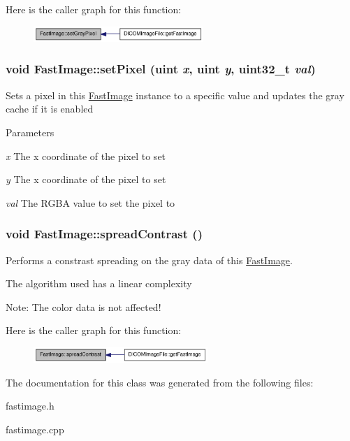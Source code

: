 Here is the caller graph for this function:\nopagebreak
\begin{figure}[H]
\begin{center}
\leavevmode
\includegraphics[width=182pt]{class_fast_image_a1e0ef4ac5b61cc6d96c9cd9c4bada344_icgraph}
\end{center}
\end{figure}


\hypertarget{class_fast_image_a647ac3b76f0198da77cd2e7afa46e1c4}{
\subsubsection[{setPixel}]{\setlength{\rightskip}{0pt plus 5cm}void FastImage::setPixel (uint {\em x}, \/  uint {\em y}, \/  uint32\_\-t {\em val})}}
\label{class_fast_image_a647ac3b76f0198da77cd2e7afa46e1c4}
Sets a pixel in this \hyperlink{class_fast_image}{FastImage} instance to a specific value and updates the gray cache if it is enabled 
\begin{DoxyParams}{Parameters}
\item[{\em x}]The x coordinate of the pixel to set \item[{\em y}]The x coordinate of the pixel to set \item[{\em val}]The RGBA value to set the pixel to \end{DoxyParams}
\hypertarget{class_fast_image_adcf6d77e79c1f75f2420c6db0d96951d}{
\subsubsection[{spreadContrast}]{\setlength{\rightskip}{0pt plus 5cm}void FastImage::spreadContrast ()}}
\label{class_fast_image_adcf6d77e79c1f75f2420c6db0d96951d}
Performs a constrast spreading on the gray data of this \hyperlink{class_fast_image}{FastImage}.

The algorithm used has a linear complexity

Note: The color data is not affected! 

Here is the caller graph for this function:\nopagebreak
\begin{figure}[H]
\begin{center}
\leavevmode
\includegraphics[width=187pt]{class_fast_image_adcf6d77e79c1f75f2420c6db0d96951d_icgraph}
\end{center}
\end{figure}




The documentation for this class was generated from the following files:\begin{DoxyCompactItemize}
\item 
fastimage.h\item 
fastimage.cpp\end{DoxyCompactItemize}

